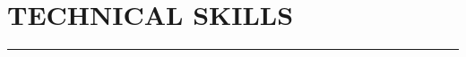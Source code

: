 \documentclass[11pt]{article}
\begin{document}
\section*{TECHNICAL SKILLS}
\vspace{-1.2em}
\noindent\rule{\linewidth}{0.4pt}

\end{document}
